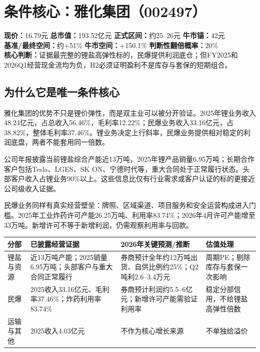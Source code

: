 \chapter{条件核心：雅化集团（002497）}

\begin{dashboardbox}[结论卡]
\textbf{现价：}16.79元 \quad \textbf{总市值：}193.52亿元 \quad \textbf{正式区间：}约25--26元 \quad \textbf{牛市锚：}42元 \\
\textbf{基准/最终空间：}约+51\% \quad \textbf{牛市空间：}+150.1\% \quad \textbf{判断性翻倍概率：}20\% \\
\textbf{核心判断：}证据最完整的锂盐高弹性标的，民爆提供利润底仓；但FY2025和2026Q1经营现金流均为负，H2必须证明盈利不是库存与套保的短期组合。
\end{dashboardbox}

\section{为什么它是唯一条件核心}

雅化集团的优势不只是锂价弹性，而是双主业可以被分开验证。2025年锂业务收入48.24亿元，占总收入56.46\%，毛利率12.22\%；民爆业务收入33.16亿元，占38.82\%，整体毛利率37.46\%。锂业务决定上行斜率，民爆业务提供相对稳定的利润底盘，两者不能套用同一倍数。

公司年报披露当前锂盐综合产能近13万吨，2025年锂产品销量6.95万吨；长期合作客户包括Tesla、LGES、SK ON、宁德时代等，重大合同处于正常履行状态。头部客户收入占锂业务90\%以上。这些信息比仅有行业需求或客户认证的标的更接近公司级收入证据。

民爆业务同样有真实经营壁垒：牌照、区域渠道、项目服务和安全运营构成进入门槛。2025年工业炸药许可产能26.25万吨、利用率83.74\%；2026年4月许可产能增至33万吨。新增许可不等于新增利润，仍需观察利用率与回款。

\begin{exhibitbox}
\small
\begin{tabularx}{\exhibitboxwidth}{L{2.3cm} L{3.2cm} L{3.2cm} X}
\toprule
分部 & 已披露经营证据 & 2026年关键预测/推断 & 估值处理 \\
\midrule
锂盐与资源 & 近13万吨产能；2025销量6.95万吨；头部客户与重大合同正常履行 & 券商预计全年约12万吨出货、自供比例约25\%；Q2吨利2.6--3.4万元 & 周期PE；剔除库存与套保一次影响 \\
民爆 & 2025收入33.16亿元、毛利率37.46\%；炸药利用率83.74\% & 券商预计利润约5.5--6亿元；新增许可产能需验证利用率 & 稳定分部信用，不给锂盐高弹性倍数 \\
运输与其他 & 2025收入4.03亿元 & 不作为核心增长来源 & 不单独给溢价 \\
\bottomrule
\end{tabularx}
\end{exhibitbox}

